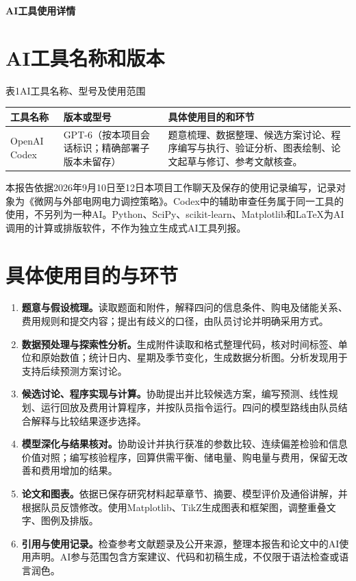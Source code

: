 \documentclass[UTF8,a4paper,12pt]{ctexart}
\begin{document}
\begin{center}\LARGE\bfseries AI工具使用详情\end{center}
\vspace{3pt}

\section{AI工具名称和版本}
\begin{center}
\small 表1\quad AI工具名称、型号及使用范围\par\vspace{5pt}
\renewcommand{\arraystretch}{1.35}
\begin{tabularx}{\linewidth}{@{}p{2.9cm}p{3.5cm}X@{}}
\toprule
工具名称 & 版本或型号 & 具体使用目的和环节\\
\midrule
OpenAI Codex & GPT-6（按本项目会话标识；精确部署子版本未留存） & 题意梳理、数据整理、候选方案讨论、程序编写与执行、验证分析、图表绘制、论文起草与修订、参考文献核查。\\
\bottomrule
\end{tabularx}
\end{center}

本报告依据2026年9月10日至12日本项目工作聊天及保存的使用记录编写，记录对象为《微网与外部电网电力调控策略》。Codex中的辅助审查任务属于同一工具的使用，不另列为一种AI。Python、SciPy、scikit-learn、Matplotlib和LaTeX为AI调用的计算或排版软件，不作为独立生成式AI工具列报。

\section{具体使用目的与环节}
\begin{enumerate}[label=\arabic*、]
\item \textbf{题意与假设梳理。}读取题面和附件，解释四问的信息条件、购电及储能关系、费用规则和提交内容；提出有歧义的口径，由队员讨论并明确采用方式。
\item \textbf{数据预处理与探索性分析。}生成附件读取和格式整理代码，核对时间标签、单位和原始数值；统计日内、星期及季节变化，生成数据分析图。分析发现用于支持后续预测方案讨论。
\item \textbf{候选讨论、程序实现与计算。}协助提出并比较候选方案，编写预测、线性规划、运行回放及费用计算程序，并按队员指令运行。四问的模型路线由队员结合解释与比较结果逐步选择。
\item \textbf{模型深化与结果核对。}协助设计并执行获准的参数比较、连续偏差检验和信息价值对照；编写核验程序，回算供需平衡、储电量、购电量与费用，保留无改善和费用增加的结果。
\item \textbf{论文和图表。}依据已保存研究材料起草章节、摘要、模型评价及通俗讲解，并根据队员反馈修改。使用Matplotlib、TikZ生成图表和框架图，调整重叠文字、图例及排版。
\item \textbf{引用与使用记录。}检查参考文献题录及公开来源，整理本报告和论文中的AI使用声明。AI参与范围包含方案建议、代码和初稿生成，不仅限于语法检查或语言润色。
\end{enumerate}
\end{document}
